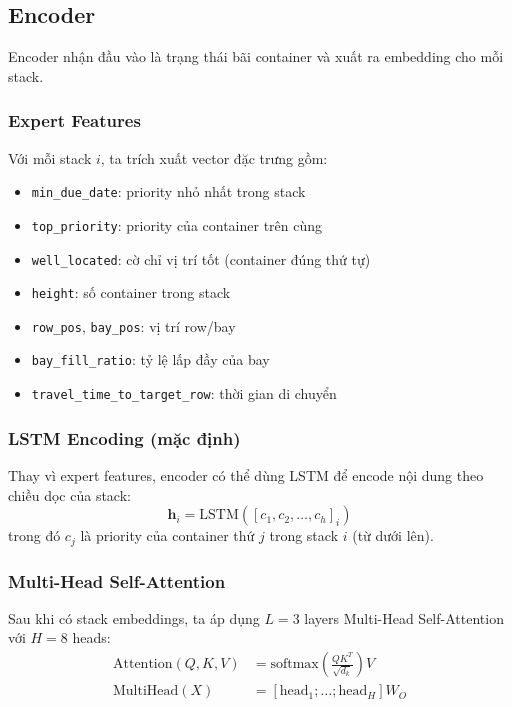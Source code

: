 \documentclass[11pt,a4paper]{article}
\theoremstyle{definition}
\begin{document}
\subsection{Encoder}

Encoder nhận đầu vào là trạng thái bãi container và xuất ra embedding cho mỗi stack.

\subsubsection{Expert Features}

Với mỗi stack $i$, ta trích xuất vector đặc trưng gồm:
\begin{itemize}
    \item \texttt{min\_due\_date}: priority nhỏ nhất trong stack
    \item \texttt{top\_priority}: priority của container trên cùng
    \item \texttt{well\_located}: cờ chỉ vị trí tốt (container đúng thứ tự)
    \item \texttt{height}: số container trong stack
    \item \texttt{row\_pos}, \texttt{bay\_pos}: vị trí row/bay
    \item \texttt{bay\_fill\_ratio}: tỷ lệ lấp đầy của bay
    \item \texttt{travel\_time\_to\_target\_row}: thời gian di chuyển
\end{itemize}

\subsubsection{LSTM Encoding (mặc định)}

Thay vì expert features, encoder có thể dùng LSTM để encode nội dung theo chiều dọc của stack:
\begin{equation}
    \mathbf{h}_i = \text{LSTM}([c_1, c_2, \dots, c_h]_i)
\end{equation}
trong đó $c_j$ là priority của container thứ $j$ trong stack $i$ (từ dưới lên).

\subsubsection{Multi-Head Self-Attention}

Sau khi có stack embeddings, ta áp dụng $L = 3$ layers Multi-Head Self-Attention với $H = 8$ heads:
\begin{align}
    \text{Attention}(Q, K, V) &= \text{softmax}\left(\frac{QK^T}{\sqrt{d_k}}\right)V \\
    \text{MultiHead}(X) &= [\text{head}_1; \dots; \text{head}_H]W_O
\end{align}
\end{document}
